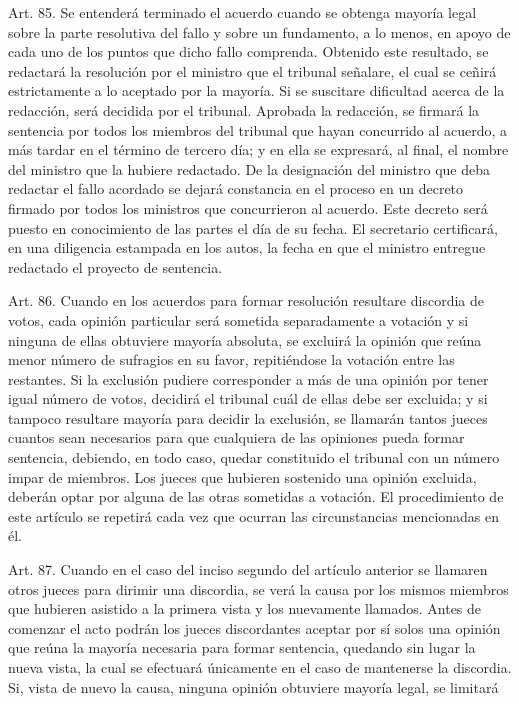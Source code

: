     Art. 85. Se entenderá terminado el acuerdo cuando se obtenga mayoría legal sobre la parte resolutiva del fallo y sobre un fundamento, a lo menos, en apoyo de cada uno de los puntos que dicho fallo comprenda.
    Obtenido este resultado, se redactará la resolución por el ministro que el tribunal señalare, el cual se ceñirá estrictamente a lo aceptado por la mayoría.
    Si se suscitare dificultad acerca de la redacción, será decidida por el tribunal.
    Aprobada la redacción, se firmará la sentencia por todos los miembros del tribunal que hayan concurrido al acuerdo, a más tardar en el término de tercero día; y en ella se expresará, al final, el nombre del ministro que la hubiere redactado.
    De la designación del ministro que deba redactar el fallo acordado se dejará constancia en el proceso en un decreto firmado por todos los ministros que concurrieron al acuerdo. Este decreto será puesto en conocimiento de las partes el día de su fecha.
    El secretario certificará, en una diligencia estampada en los autos, la fecha en que el ministro entregue redactado el proyecto de sentencia.

    Art. 86. Cuando en los acuerdos para formar resolución resultare discordia de votos, cada opinión particular será sometida separadamente a votación y si ninguna de ellas obtuviere mayoría absoluta, se excluirá la opinión que reúna menor número de sufragios en su favor, repitiéndose la votación entre las restantes.
    Si la exclusión pudiere corresponder a más de una opinión por tener igual número de votos, decidirá el tribunal cuál de ellas debe ser excluida; y si tampoco resultare mayoría para decidir la exclusión, se llamarán tantos jueces cuantos sean necesarios para que cualquiera de las opiniones pueda formar sentencia, debiendo, en todo caso, quedar constituido el tribunal con un número impar de miembros.
    Los jueces que hubieren sostenido una opinión excluida, deberán optar por alguna de las otras sometidas a votación.
    El procedimiento de este artículo se repetirá cada vez que ocurran las circunstancias mencionadas en él.


    Art. 87. Cuando en el caso del inciso segundo del artículo anterior se llamaren otros jueces para dirimir una discordia, se verá la causa por los mismos miembros que hubieren asistido a la primera vista y los nuevamente llamados.
    Antes de comenzar el acto podrán los jueces discordantes aceptar por sí solos una opinión que reúna la mayoría necesaria para formar sentencia, quedando sin lugar la nueva vista, la cual se efectuará únicamente en el caso de mantenerse la discordia.
    Si, vista de nuevo la causa, ninguna opinión obtuviere mayoría legal, se limitará la votación a las que hubieren quedado pendientes al tiempo de llamarse a los nuevos jueces.
    En caso de nueva vista de una causa por discordia ocurrida en la primera, el Presidente del tribunal podrá indicar a los abogados de las partes el punto materia del empate para que limiten a él sus alegaciones.


